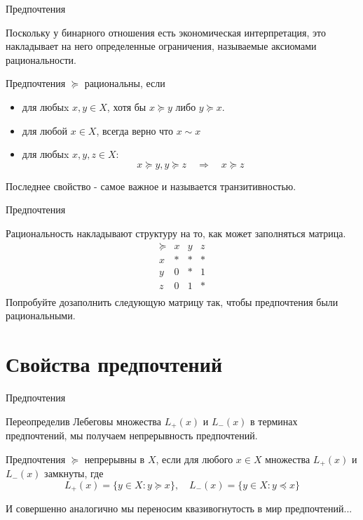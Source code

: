 \documentclass{beamer}
\begin{document}
\begin{frame}{Предпочтения}

Поскольку у бинарного отношения есть экономическая интерпретация, это накладывает на него определенные ограничения, называемые \alert{аксиомами рациональности}.

\begin{definition}
Предпочтения $\succcurlyeq$	\alert{рациональны}, если
\begin{itemize}
\item для любыx $x, y \in X$, хотя бы $x \succcurlyeq y$ либо $y \succcurlyeq x$.
\item для любой $x \in X$, всегда верно что $x \sim x$
\item для любыx $x, y, z \in X$: 
$$x \succcurlyeq y, y \succcurlyeq z \quad \Rightarrow \quad x \succcurlyeq z$$
\end{itemize}
\end{definition}
Последнее свойство - самое важное и называется \alert{транзитивностью}. 

\end{frame}

\begin{frame}{Предпочтения}

Рациональность накладывают структуру на то, как может заполняться матрица. 
$$ 
\begin{array}{c|ccc}
 \succcurlyeq & x & y & z\\
\hline
x & * & * & * \\
y & 0 & * & 1\\
z & 0 & 1 & *\\
\end{array}
$$
Попробуйте дозаполнить следующую матрицу так, чтобы предпочтения были рациональными.

\end{frame}

\section{Свойства предпочтений}

\begin{frame}{Предпочтения}

Переопределив Лебеговы множества $L_{+}(x)$ и $L_{-}(x)$ в терминах предпочтений, мы получаем непрерывность предпочтений.

\begin{definition}
Предпочтения $\succcurlyeq$ \alert{непрерывны} в $X$, если для любого $x \in X$ множества $L_{+}(x)$ и $L_{-}(x)$ замкнуты, где
$$L_{+}(x) = \{y \in X: y \succcurlyeq x\}, \quad L_{-}(x) = \{y \in X: y \preccurlyeq x\}$$
\end{definition}

И совершенно аналогично мы переносим квазивогнутость в мир предпочтений...

\end{frame}
\end{document}
